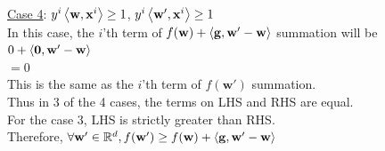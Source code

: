 \documentclass[a4paper,11pt]{article}
\begin{document}
\begin{mlsolution}
\underline{Case 4}: $y^i \left\langle{\mathbf{w}},{\mathbf{x}^i}\right\rangle \geq 1$, $y^i \left\langle{\mathbf{w'}},{\mathbf{x}^i}\right\rangle \geq 1$
\\In this case, the $i$'th term of $f(\mathbf{w}) + \left\langle{\mathbf{g}},{\mathbf{w'-w}}\right\rangle$ summation will be
\\ $0 + \left\langle{\mathbf{0}},{\mathbf{w'-w}}\right\rangle  $
\\ $ = 0$
\\This is the same as the $i$'th term of $f(\mathbf{w'})$ summation.
\\ Thus in 3 of the 4 cases, the terms on LHS and RHS are equal.
\\ For the case 3, LHS is strictly greater than RHS.
\\Therefore, $\forall \mathbf{w'} \in \mathbb{R}^d, f(\mathbf{w'}) \geq f(\mathbf{w}) + \left\langle{\mathbf{g}},{\mathbf{w'-w}}\right\rangle$



\end{mlsolution}
\end{document}
